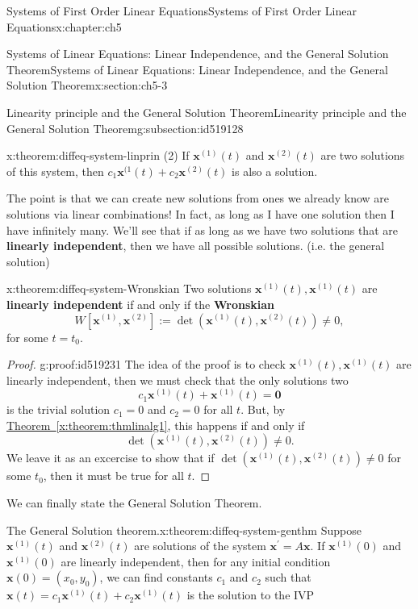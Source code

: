 \documentclass[oneside,10pt,]{book}
\newcommand{\xreffont}{\relax}
\newcommand{\terminology}[1]{\textbf{#1}}
\numberwithin{equation}{section}
\numberwithin{equation}{section}
\begin{document}
\begin{chapterptx}{Systems of First Order Linear Equations}{}{Systems of First Order Linear Equations}{}{}{x:chapter:ch5}
\begin{sectionptx}{Systems of Linear Equations: Linear Independence, and the General Solution Theorem}{}{Systems of Linear Equations: Linear Independence, and the General Solution Theorem}{}{}{x:section:ch5-3}
\begin{subsectionptx}{Linearity principle and the General Solution Theorem}{}{Linearity principle and the General Solution Theorem}{}{}{g:subsection:id519128}
\begin{theorem}{}{}{x:theorem:diffeq-system-linprin}
(2) If \(\mathbf{x}^{(1)}(t)\) and \(\mathbf{x}^{(2)}(t)\) are two solutions of this system, then \(c_{1}\mathbf{x}^{(1}(t)+c_{2}\mathbf{x}^{(2)}(t)\) is also a solution.%
\end{theorem}
The point is that we can create new solutions from ones we already know are solutions via linear combinations! In fact, as long as I have one solution then I have infinitely many. We'll see that if as long as we have two solutions that are \terminology{linearly independent}, then we have all possible solutions. (i.e. the general solution)%
\begin{theorem}{}{}{x:theorem:diffeq-system-Wronskian}%
Two solutions \(\mathbf{x}^{(1)}(t),\mathbf{x}^{(1)}(t)\) are \terminology{linearly independent} if and only if the \terminology{Wronskian}%
\begin{equation*}
W\left[\mathbf{x}^{(1)},\mathbf{x}^{(2)}\right]:=\det\left(\mathbf{x}^{(1)}(t),\mathbf{x}^{(2)}(t)\right)\neq0,
\end{equation*}
for some \(t=t_{0}\).%
\end{theorem}
\begin{proof}{}{g:proof:id519231}
The idea of the proof is to check \(\mathbf{x}^{(1)}(t),\mathbf{x}^{(1)}(t)\) are linearly independent, then we must check that the only solutions two%
\begin{equation*}
c_{1}\mathbf{x}^{(1)}(t)+\mathbf{x}^{(1)}(t)=\mathbf{0}
\end{equation*}
is the trivial solution \(c_{1}=0\) and \(c_{2}=0\) for all \(t\). But, by \hyperref[x:theorem:thmlinalg1]{Theorem~{\xreffont\ref{x:theorem:thmlinalg1}}}, this happens if and only if%
\begin{equation*}
\det\left(\mathbf{x}^{(1)}(t),\mathbf{x}^{(2)}(t)\right)\neq0.
\end{equation*}
We leave it as an excercise to show that if \(\det\left(\mathbf{x}^{(1)}(t),\mathbf{x}^{(2)}(t)\right)\neq0\) for some \(t_{0}\), then it must be true for all \(t\).%
\end{proof}
We can finally state the General Solution Theorem.%
\begin{theorem}{The General Solution theorem.}{}{x:theorem:diffeq-system-genthm}%
Suppose \(\mathbf{x}^{(1)}(t)\) and \(\mathbf{x}^{(2)}(t)\) are solutions of the system \(\mathbf{x}^{\prime}=A\mathbf{x}\). If \(\mathbf{x}^{(1)}(0)\) and \(\mathbf{x}^{(1)}(0)\) are linearly independent, then for any initial condition \(\mathbf{x}(0)=\left(x_{0},y_{0}\right)\), we can find constants \(c_{1}\) and \(c_{2}\) such that \(\mathbf{x}(t)=c_{1}\mathbf{x}^{(1)}(t)+c_{2}\mathbf{x}^{(1)}(t)\) is the solution to the IVP%

\end{theorem}
\end{subsectionptx}
\end{sectionptx}
\end{chapterptx}
\end{document}
